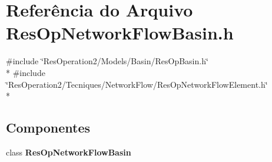 \section{Referência do Arquivo Res\+Op\+Network\+Flow\+Basin.\+h}
\label{_res_op_network_flow_basin_8h}
{\ttfamily \#include \char`\"{}Res\+Operation2/\+Models/\+Basin/\+Res\+Op\+Basin.\+h\char`\"{}}\\*
{\ttfamily \#include \char`\"{}Res\+Operation2/\+Tecniques/\+Network\+Flow/\+Res\+Op\+Network\+Flow\+Element.\+h\char`\"{}}\\*
\subsection*{Componentes}
\begin{DoxyCompactItemize}
\item 
class {\bf Res\+Op\+Network\+Flow\+Basin}
\end{DoxyCompactItemize}

